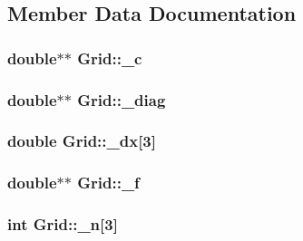 \subsection{Member Data Documentation}
\subsubsection[{\texorpdfstring{\+\_\+c}{_c}}]{\setlength{\rightskip}{0pt plus 5cm}double$\ast$$\ast$ Grid\+::\+\_\+c\hspace{0.3cm}{\ttfamily [private]}}\hypertarget{class_grid_aa4c430971c64d8181e721b9d9a495ae5}{}\label{class_grid_aa4c430971c64d8181e721b9d9a495ae5}
\subsubsection[{\texorpdfstring{\+\_\+diag}{_diag}}]{\setlength{\rightskip}{0pt plus 5cm}double$\ast$$\ast$ Grid\+::\+\_\+diag\hspace{0.3cm}{\ttfamily [private]}}\hypertarget{class_grid_a8476f98ceb01a28eed949abfc1123478}{}\label{class_grid_a8476f98ceb01a28eed949abfc1123478}
\subsubsection[{\texorpdfstring{\+\_\+dx}{_dx}}]{\setlength{\rightskip}{0pt plus 5cm}double Grid\+::\+\_\+dx\mbox{[}3\mbox{]}\hspace{0.3cm}{\ttfamily [private]}}\hypertarget{class_grid_a34b81976f4c80eb2641224886bb6a339}{}\label{class_grid_a34b81976f4c80eb2641224886bb6a339}
\subsubsection[{\texorpdfstring{\+\_\+f}{_f}}]{\setlength{\rightskip}{0pt plus 5cm}double$\ast$$\ast$ Grid\+::\+\_\+f\hspace{0.3cm}{\ttfamily [private]}}\hypertarget{class_grid_a5a7d695ace939b99ed0a3490ce6d80b1}{}\label{class_grid_a5a7d695ace939b99ed0a3490ce6d80b1}
\subsubsection[{\texorpdfstring{\+\_\+n}{_n}}]{\setlength{\rightskip}{0pt plus 5cm}int Grid\+::\+\_\+n\mbox{[}3\mbox{]}\hspace{0.3cm}{\ttfamily [private]}}\hypertarget{class_grid_a41b2d78ec79a5e02aca5ae5d7211015f}{}\label{class_grid_a41b2d78ec79a5e02aca5ae5d7211015f}

